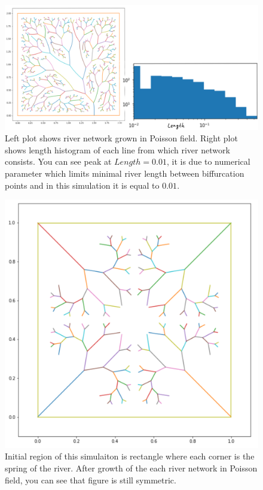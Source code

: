 \documentclass[]{pracamgr}
\begin{document}
        \begin{figure}[H]
          \centering
          \includegraphics[width=1\textwidth]{figs/histogram.png}        
          \caption{Left plot shows river network grown in Poisson field. Right plot shows length histogram of each line from which river network consists. You can see peak at $Length = 0.01$, it is due to numerical parameter which limits minimal river length between biffurcation points and in this simulation it is equal to $0.01$.}
        \end{figure}

        \begin{figure}[H]
          \centering
          \includegraphics[width=1\textwidth]{figs/symmetic_rivers.png}        
          \caption{Initial region of this simulaiton is rectangle where each corner is the spring of the river. After growth of the each river network in Poisson field, you can see that figure is still symmetric.}
        \end{figure}
\end{document}
